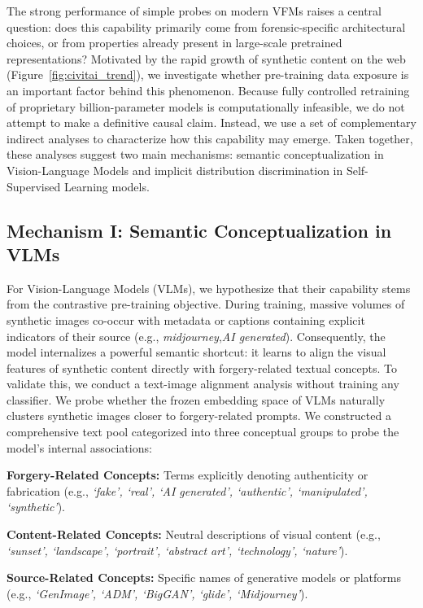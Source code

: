 \documentclass[sigconf,screen]{acmart}
\theoremstyle{plain}
\theoremstyle{definition}
\theoremstyle{remark}
\begin{document}
The strong performance of simple probes on modern VFMs raises a central question: does this capability primarily come from forensic-specific architectural choices, or from properties already present in large-scale pretrained representations? Motivated by the rapid growth of synthetic content on the web (Figure~\ref{fig:civitai_trend}), we investigate whether pre-training data exposure is an important factor behind this phenomenon. Because fully controlled retraining of proprietary billion-parameter models is computationally infeasible, we do not attempt to make a definitive causal claim. Instead, we use a set of complementary indirect analyses to characterize how this capability may emerge. Taken together, these analyses suggest two main mechanisms: semantic conceptualization in Vision-Language Models and implicit distribution discrimination in Self-Supervised Learning models.

\subsection{Mechanism I: Semantic Conceptualization in VLMs}
\label{subsec:mechanism_vlm}

For Vision-Language Models (VLMs), we hypothesize that their capability stems from the contrastive pre-training objective. During training, massive volumes of synthetic images co-occur with metadata or captions containing explicit indicators of their source (e.g., \emph{midjourney},\emph{AI generated}). Consequently, the model internalizes a powerful semantic shortcut: it learns to align the visual features of synthetic content directly with forgery-related textual concepts.
To validate this, we conduct a text-image alignment analysis without training any classifier. We probe whether the frozen embedding space of VLMs naturally clusters synthetic images closer to forgery-related prompts. We constructed a comprehensive text pool categorized into three conceptual groups to probe the model's internal associations:
\begin{compactitem}
\item \textbf{Forgery-Related Concepts:} Terms explicitly denoting authenticity or fabrication (e.g., \emph{`fake', `real', `AI generated', `authentic', `manipulated', `synthetic'}).
\item \textbf{Content-Related Concepts:} Neutral descriptions of visual content (e.g., \emph{`sunset', `landscape', `portrait', `abstract art', `technology', `nature'}).
\item \textbf{Source-Related Concepts:} Specific names of generative models or platforms (e.g., \emph{`GenImage', `ADM', `BigGAN', `glide', `Midjourney'}).
\end{compactitem} 
\end{document}

